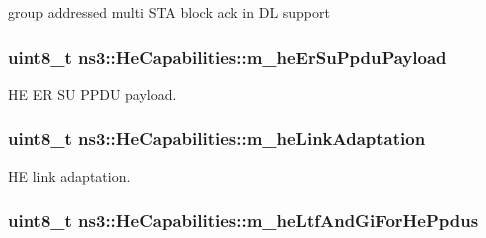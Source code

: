 group addressed multi S\+TA block ack in DL support 

\subsubsection[{\texorpdfstring{m\+\_\+he\+Er\+Su\+Ppdu\+Payload}{m_heErSuPpduPayload}}]{\setlength{\rightskip}{0pt plus 5cm}uint8\+\_\+t ns3\+::\+He\+Capabilities\+::m\+\_\+he\+Er\+Su\+Ppdu\+Payload\hspace{0.3cm}{\ttfamily [private]}}\hypertarget{classns3_1_1HeCapabilities_a10a1a090e7132b4e1e9eb2977ced7cfa}{}\label{classns3_1_1HeCapabilities_a10a1a090e7132b4e1e9eb2977ced7cfa}


HE ER SU P\+P\+DU payload. 

\subsubsection[{\texorpdfstring{m\+\_\+he\+Link\+Adaptation}{m_heLinkAdaptation}}]{\setlength{\rightskip}{0pt plus 5cm}uint8\+\_\+t ns3\+::\+He\+Capabilities\+::m\+\_\+he\+Link\+Adaptation\hspace{0.3cm}{\ttfamily [private]}}\hypertarget{classns3_1_1HeCapabilities_ae2b5bc6d8d8b218dbac1efdacc689abb}{}\label{classns3_1_1HeCapabilities_ae2b5bc6d8d8b218dbac1efdacc689abb}


HE link adaptation. 

\subsubsection[{\texorpdfstring{m\+\_\+he\+Ltf\+And\+Gi\+For\+He\+Ppdus}{m_heLtfAndGiForHePpdus}}]{\setlength{\rightskip}{0pt plus 5cm}uint8\+\_\+t ns3\+::\+He\+Capabilities\+::m\+\_\+he\+Ltf\+And\+Gi\+For\+He\+Ppdus\hspace{0.3cm}{\ttfamily [private]}}\hypertarget{classns3_1_1HeCapabilities_ac0d27f9b4d2a8c9de09e5d5382998ddd}{}\label{classns3_1_1HeCapabilities_ac0d27f9b4d2a8c9de09e5d5382998ddd}



